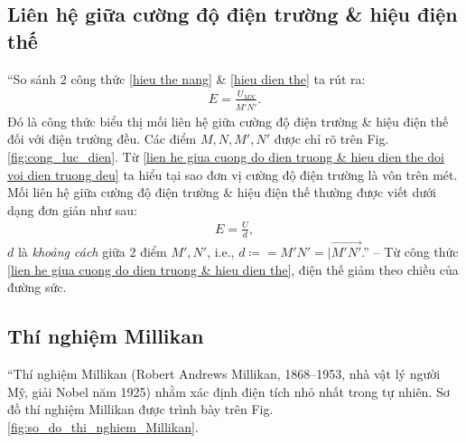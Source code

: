 \documentclass[oneside]{book}
\numberwithin{equation}{section}
\begin{document}
\subsection{Liên hệ giữa cường độ điện trường \& hiệu điện thế}
``So sánh 2 công thức \eqref{hieu the nang} \& \eqref{hieu dien the} ta rút ra:
\begin{align}
	\label{lien he giua cuong do dien truong & hieu dien the doi voi dien truong deu}
	E = \frac{U_{MN}}{\overline{M'N'}}.
\end{align}
Đó là công thức biểu thị mối liên hệ giữa cường độ điện trường \& hiệu điện thế đối với điện trường đều. Các điểm $M,N,M',N'$ được chỉ rõ trên Fig. \ref{fig:cong_luc_dien}. Từ \eqref{lien he giua cuong do dien truong & hieu dien the doi voi dien truong deu} ta hiểu tại sao đơn vị cường độ điện trường là vôn trên mét. Mối liên hệ giữa cường độ điện trường \& hiệu điện thế thường được viết dưới dạng đơn giản như sau:
\begin{align}
	\label{lien he giua cuong do dien truong & hieu dien the}
	E = \frac{U}{d},
\end{align}
$d$ là \textit{khoảng cách} giữa 2 điểm $M',N'$, i.e., $d\coloneqq = M'N' = |\overrightarrow{M'N'}$.'' -- \cite[pp. 21--22]{SGK_Vat_Ly_11_nang_cao} Từ công thức \eqref{lien he giua cuong do dien truong & hieu dien the}, điện thế giảm theo chiều của đường sức.

\subsection{Thí nghiệm Millikan}
``Thí nghiệm Millikan (Robert Andrews Millikan, 1868--1953, nhà vật lý người Mỹ, giải Nobel năm 1925) nhằm xác định điện tích nhỏ nhất trong tự nhiên. Sơ đồ thí nghiệm Millikan được trình bày trên Fig. \ref{fig:so_do_thi_nghiem_Millikan}.
\end{document}
